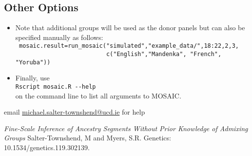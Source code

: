 \documentclass{article}
\begin{document}
\subsection{Other Options}
\begin{itemize}
  \item Note that additional groups will be used as the donor panels but can also be specified manually as follows:\\
\verb+ mosaic.result=run_mosaic("simulated","example_data/",18:22,2,3,+\\
\verb+                          c("English","Mandenka", "French", "Yoruba"))+


\item Finally, use \\
\verb+Rscript mosaic.R --help+\\
on the command line to list all arguments to MOSAIC. 
\end{itemize}


email \url{michael.salter-townshend@ucd.ie} for help


\begin{thebibliography}{2}

    \textit{Fine-Scale Inference of Ancestry Segments Without Prior Knowledge of Admixing Groups}
{Salter-Townshend, M {\rm and} Myers, S.R.}
    Genetics: 10.1534/genetics.119.302139.

\end{thebibliography}
\end{document}
